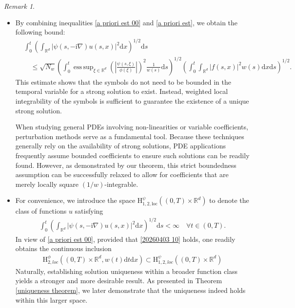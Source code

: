 \documentclass[11pt,reqno]{amsart}
\theoremstyle{definition}
\theoremstyle{remark}
\newtheorem{rem}[thm]{Remark}
\newcommand\bR{\mathbb{R}}
\DeclareMathOperator*{\esssup}{ess\,sup}
\numberwithin{equation}{section}
\begin{document}
\begin{rem}
\begin{itemize}
\item 
By combining inequalities \eqref{a priori est 00} and \eqref{a priori est}, we obtain the following bound:
$$
\begin{aligned}
&\int_0^t \left( \int_{\bR^d}  \left| \psi(s,-\mathrm{i}\nabla) u(s,x) \right|^2 \mathrm{d}x  \right)^{1/2} \mathrm{d}s \\
&\quad\leq  \sqrt{N_w}\left(\int_0^t  \esssup_{\xi \in \bR^d} \left(\left| \frac{\psi(s,\xi)}{\phi(\xi)} \right|\right)^2 \frac{1}{w(s)} \mathrm{d}s \right)^{1/2}
\left(\int_0^t\int_{\bR^d}|f(s,x)|^2 w(s) \mathrm{d}x\mathrm{d}s\right)^{1/2}.
\end{aligned}
$$
This estimate shows that the symbols do not need to be bounded in the temporal variable for a strong solution to exist. 
Instead, weighted local integrability of the symbols is sufficient to guarantee the existence of a unique strong solution.

When studying general PDEs involving non-linearities or variable coefficients, perturbation methods serve as a fundamental tool. Because these techniques generally rely on the availability of strong solutions, PDE applications frequently assume bounded coefficients to ensure such solutions can be readily found. 
However, as demonstrated by our theorem, this strict boundedness assumption can be successfully relaxed to allow for coefficients that are merely locally square $(1/w)$-integrable.

\item 

For convenience, we introduce the space $\mathrm{H}_{1,2,\mathrm{loc}}^{\psi}\left( (0,T) \times \bR^d\right)$ to denote the class of functions $u$ satisfying
\begin{align}
									\label{psi space}
\int_0^t \left( \int_{\bR^d}  \left| \psi(s,-\mathrm{i}\nabla) u(s,x) \right|^2 \mathrm{d}x  \right)^{1/2} \mathrm{d}s < \infty \quad \forall t \in (0,T).
\end{align}
In view of \eqref{a priori est 00}, provided that \eqref{20260403 10} holds, one readily obtains the continuous inclusion
\begin{align*}
\mathrm{H}_{2,loc}^{\phi}\left( (0,T) \times \bR^d, w(t)\mathrm{d}t\mathrm{d}x \right)
\subset 
\mathrm{H}_{1,2,loc}^{\psi}\left( (0,T) \times \bR^d \right)
\end{align*}
Naturally, establishing solution uniqueness within a broader function class yields a stronger and more desirable result. 
As presented in Theorem \ref{uniqueness theorem}, we later demonstrate that the uniqueness indeed holds within this larger space.



\end{itemize}
\end{rem}
\end{document}
